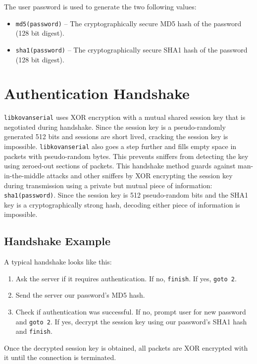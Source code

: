 \documentclass{article}
\newcommand{\lks}[0]{\texttt{libkovanserial} }
\begin{document}
	The user password is used to generate the two following values:
	
	\begin{itemize}
		\item \texttt{md5(password)} -- The cryptographically secure MD5 hash of the password (128 bit digest). 
		\item \texttt{sha1(password)} -- The cryptographically secure SHA1 hash of the password (128 bit digest).
	\end{itemize}
	
	\section{Authentication Handshake}
	
	\lks uses XOR encryption with a mutual shared session key that is negotiated during handshake. Since the session key is a pseudo-randomly generated
	512 bits and sessions are short lived, cracking the session key is impossible. \lks also goes a step further and fills empty space in packets with
	pseudo-random bytes. This prevents sniffers from detecting the key using zeroed-out sections of packets. This handshake method guards against
	man-in-the-middle attacks and other sniffers by XOR encrypting the session key during transmission using a private but mutual piece of information:
	\texttt{sha1(password)}. Since the session key is 512 pseudo-random bits and the SHA1 key is a cryptographically strong hash, decoding either piece
	of information is impossible.
	
	\subsection{Handshake Example}
	
	A typical handshake looks like this:
	
	\begin{enumerate}
		\item Ask the server if it requires authentication. If no, \texttt{finish}. If yes, \texttt{goto 2}.
		\item Send the server our password's MD5 hash.
		\item Check if authentication was successful. If no, prompt user for new password and \texttt{goto 2}.
		If yes, decrypt the session key using our password's SHA1 hash and \texttt{finish}.
	\end{enumerate}
	
	Once the decrypted session key is obtained, all packets are XOR encrypted with it until the connection is terminated.
	
\end{document}
